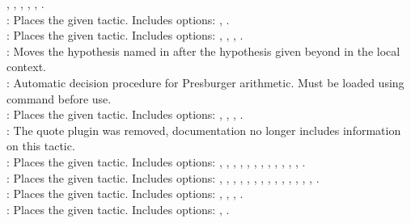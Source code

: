 	, , , , 
	, .  
\\
 : Places the given tactic. Includes options: 
	, . 
\\
 : Places the given tactic. Includes options: 
	, , , . 
\\
 : Moves the hypothesis named in  after the hypothesis given beyond 
	 in the local context. 
\\
 : Automatic decision procedure for Presburger arithmetic. 
	Must be loaded using command  before use. 
\\
 : Places the given tactic. Includes options: 
	, , , . 
\\
 : The quote plugin was removed, documentation no longer includes information on this tactic. 
\\
 : Places the given tactic. Includes options: 
	, , , , , , 
	, , , , 
	, , . 
\\
 : Places the given tactic. Includes options: 
	, , , , , 
	, , , , 
	, , , , , . 
\\
 : Places the given tactic. Includes options: 
	, , , . 
\\
 : Places the given tactic. Includes options: 
	, .  






	
~\\
